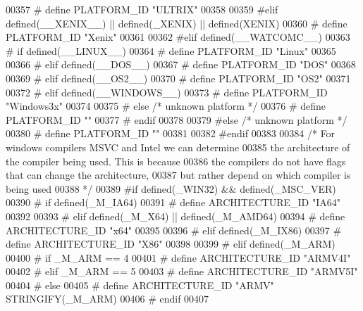 \begin{DoxyCode}
{{{{{{{{{{{{{{{{{{{{{{{{{{{{{{{{{{{00357 \textcolor{preprocessor}{# define PLATFORM\_ID "ULTRIX"}
00358 
00359 \textcolor{preprocessor}{#elif defined(\_\_XENIX\_\_) || defined(\_XENIX) || defined(XENIX)}
00360 \textcolor{preprocessor}{# define PLATFORM\_ID "Xenix"}
00361 
00362 \textcolor{preprocessor}{#elif defined(\_\_WATCOMC\_\_)}
00363 \textcolor{preprocessor}{# if defined(\_\_LINUX\_\_)}
00364 \textcolor{preprocessor}{#  define PLATFORM\_ID "Linux"}
00365 
00366 \textcolor{preprocessor}{# elif defined(\_\_DOS\_\_)}
00367 \textcolor{preprocessor}{#  define PLATFORM\_ID "DOS"}
00368 
00369 \textcolor{preprocessor}{# elif defined(\_\_OS2\_\_)}
00370 \textcolor{preprocessor}{#  define PLATFORM\_ID "OS2"}
00371 
00372 \textcolor{preprocessor}{# elif defined(\_\_WINDOWS\_\_)}
00373 \textcolor{preprocessor}{#  define PLATFORM\_ID "Windows3x"}
00374 
00375 \textcolor{preprocessor}{# else }\textcolor{comment}{/* unknown platform */}\textcolor{preprocessor}{}
00376 \textcolor{preprocessor}{#  define PLATFORM\_ID ""}
00377 \textcolor{preprocessor}{# endif}
00378 
00379 \textcolor{preprocessor}{#else }\textcolor{comment}{/* unknown platform */}\textcolor{preprocessor}{}
00380 \textcolor{preprocessor}{# define PLATFORM\_ID ""}
00381 
00382 \textcolor{preprocessor}{#endif}
00383 
00384 \textcolor{comment}{/* For windows compilers MSVC and Intel we can determine}
00385 \textcolor{comment}{   the architecture of the compiler being used.  This is because}
00386 \textcolor{comment}{   the compilers do not have flags that can change the architecture,}
00387 \textcolor{comment}{   but rather depend on which compiler is being used}
00388 \textcolor{comment}{*/}
00389 \textcolor{preprocessor}{#if defined(\_WIN32) && defined(\_MSC\_VER)}
00390 \textcolor{preprocessor}{# if defined(\_M\_IA64)}
00391 \textcolor{preprocessor}{#  define ARCHITECTURE\_ID "IA64"}
00392 
00393 \textcolor{preprocessor}{# elif defined(\_M\_X64) || defined(\_M\_AMD64)}
00394 \textcolor{preprocessor}{#  define ARCHITECTURE\_ID "x64"}
00395 
00396 \textcolor{preprocessor}{# elif defined(\_M\_IX86)}
00397 \textcolor{preprocessor}{#  define ARCHITECTURE\_ID "X86"}
00398 
00399 \textcolor{preprocessor}{# elif defined(\_M\_ARM)}
00400 \textcolor{preprocessor}{#  if \_M\_ARM == 4}
00401 \textcolor{preprocessor}{#   define ARCHITECTURE\_ID "ARMV4I"}
00402 \textcolor{preprocessor}{#  elif \_M\_ARM == 5}
00403 \textcolor{preprocessor}{#   define ARCHITECTURE\_ID "ARMV5I"}
00404 \textcolor{preprocessor}{#  else}
00405 \textcolor{preprocessor}{#   define ARCHITECTURE\_ID "ARMV" STRINGIFY(\_M\_ARM)}
00406 \textcolor{preprocessor}{#  endif}
00407 
}}}}}}}}}}}}}}}}}}}}}}}}}}}}}}}}}}}
\end{DoxyCode}
